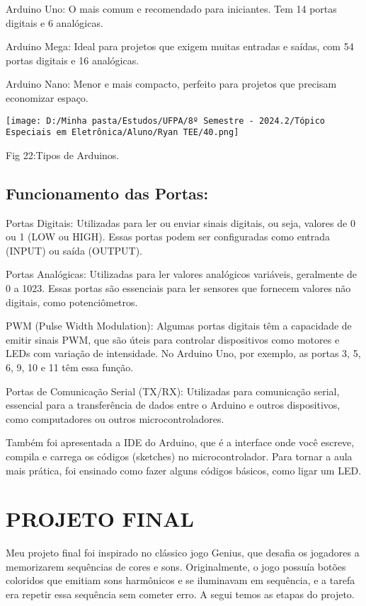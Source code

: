\documentclass[
]{book}
\begin{document}
Arduino Uno: O mais comum e recomendado para iniciantes. Tem 14 portas digitais e 6 analógicas.

Arduino Mega: Ideal para projetos que exigem muitas entradas e saídas, com 54 portas digitais e 16 analógicas.

Arduino Nano: Menor e mais compacto, perfeito para projetos que precisam economizar espaço.

\texttt{[image: D:/Minha pasta/Estudos/UFPA/8º Semestre - 2024.2/Tópico Especiais em Eletrônica/Aluno/Ryan TEE/40.png]}

Fig 22:Tipos de Arduinos.

\section{Funcionamento das Portas:}\label{funcionamento-das-portas}

Portas Digitais: Utilizadas para ler ou enviar sinais digitais, ou seja, valores de 0 ou 1 (LOW ou HIGH). Essas portas podem ser configuradas como entrada (INPUT) ou saída (OUTPUT).

Portas Analógicas: Utilizadas para ler valores analógicos variáveis, geralmente de 0 a 1023. Essas portas são essenciais para ler sensores que fornecem valores não digitais, como potenciômetros.

PWM (Pulse Width Modulation): Algumas portas digitais têm a capacidade de emitir sinais PWM, que são úteis para controlar dispositivos como motores e LEDs com variação de intensidade. No Arduino Uno, por exemplo, as portas 3, 5, 6, 9, 10 e 11 têm essa função.

Portas de Comunicação Serial (TX/RX): Utilizadas para comunicação serial, essencial para a transferência de dados entre o Arduino e outros dispositivos, como computadores ou outros microcontroladores.

Também foi apresentada a IDE do Arduino, que é a interface onde você escreve, compila e carrega os códigos (sketches) no microcontrolador. Para tornar a aula mais prática, foi ensinado como fazer alguns códigos básicos, como ligar um LED.

\chapter{PROJETO FINAL}\label{projeto-final}

Meu projeto final foi inspirado no clássico jogo Genius, que desafia os jogadores a memorizarem sequências de cores e sons. Originalmente, o jogo possuía botões coloridos que emitiam sons harmônicos e se iluminavam em sequência, e a tarefa era repetir essa sequência sem cometer erro. A segui temos as etapas do projeto.
\end{document}
